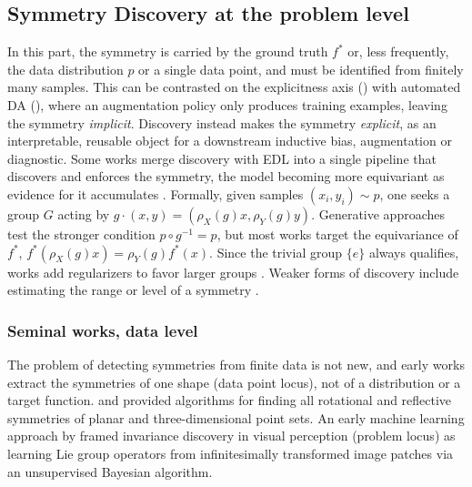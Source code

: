 \documentclass[mathematics,review,submit,moreauthors]{Definitions/mdpi}
\begin{document}
\subsection{Symmetry Discovery at the problem level}\label{sec:sym-disc-from-data}
In this part, the symmetry is carried by the ground truth $f^*$ or, less frequently, the data distribution $p$ or a single data point, and must be identified from finitely many samples.
This can be contrasted on the explicitness axis () with automated DA (), where an augmentation policy only produces training examples, leaving the symmetry \emph{implicit}.
Discovery instead makes the symmetry \emph{explicit}, as an interpretable, reusable object for a downstream inductive bias, augmentation or diagnostic.
Some works merge discovery with EDL into a single pipeline that discovers and enforces the symmetry, the model becoming more equivariant as evidence for it accumulates \citep{benton2020anips,otto2025,escriche2025}.
Formally, given samples $(x_i,y_i)\sim p$, one seeks a group $G$ acting by $g\cdot(x,y)=(\rho_X(g)x,\rho_Y(g)y)$.
Generative approaches test the stronger condition $p\circ g^{-1}=p$, but most works target the equivariance of $f^*$, $f^*(\rho_X(g)x)=\rho_Y(g)f^*(x)$.
Since the trivial group $\{e\}$ always qualifies, works add regularizers to favor larger groups \citep{benton2020anips,yang2023p4icml,escriche2025}.
Weaker forms of discovery include estimating the range or level of a symmetry \citep{benton2020anips,ouderaa2022}.


\subsubsection{Seminal works, data level}
The problem of detecting symmetries from finite data is not new, and early works extract the symmetries of one shape (data point locus), not of a distribution or a target function.
\citet{highnam1985} and \citet{wolter1985tvc} provided algorithms for finding all rotational and reflective symmetries of planar and three-dimensional point sets.
An early machine learning approach by \citet{rao1998anips} framed invariance discovery in visual perception (problem locus) as learning Lie group operators from infinitesimally transformed image patches via an unsupervised Bayesian algorithm.
\end{document}
